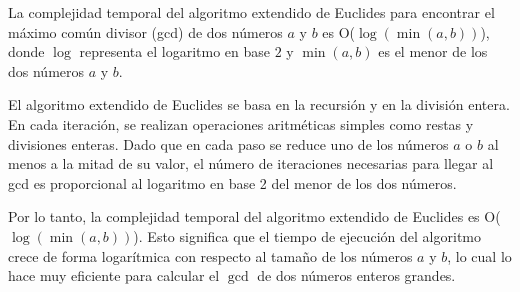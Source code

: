 La complejidad temporal del algoritmo extendido de Euclides para encontrar el máximo común divisor (gcd) de dos números $a$ y $b$ es O($\log(\min(a, b))$), donde $\log$ representa el logaritmo en base $2$ y $\min(a, b)$ es el menor de los dos números $a$ y $b$.

El algoritmo extendido de Euclides se basa en la recursión y en la división entera. En cada iteración, se realizan operaciones aritméticas simples como restas y divisiones enteras. Dado que en cada paso se reduce uno de los números $a$ o $b$ al menos a la mitad de su valor, el número de iteraciones necesarias para llegar al gcd es proporcional al logaritmo en base 2 del menor de los dos números.

Por lo tanto, la complejidad temporal del algoritmo extendido de Euclides es O($\log(\min(a, b))$). Esto significa que el tiempo de ejecución del algoritmo crece de forma logarítmica con respecto al tamaño de los números $a$ y $b$, lo cual lo hace muy eficiente para calcular el $\gcd$ de dos números enteros grandes.